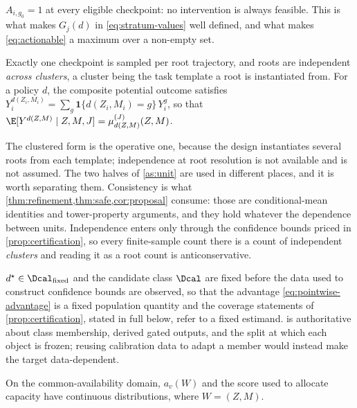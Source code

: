\begin{assumption}
\label{as:baseline}
$A_{i,g_0}=1$ at every eligible checkpoint: no intervention is always feasible.
This is what makes $G_j(d)$ in \eqref{eq:stratum-values} well defined, and what
makes \eqref{eq:actionable} a maximum over a non-empty set.
\end{assumption}

\begin{assumption}
\label{as:unit}
Exactly one checkpoint is sampled per root trajectory, and roots are independent
\emph{across clusters}, a cluster being the task template a root is instantiated
from.  For a policy $d$, the composite potential outcome satisfies
$Y^{d(Z_i,M_i)}_i=\sum_{g}\mathbf 1\{d(Z_i,M_i)=g\}\,Y^g_i$, so that
$\E[Y^{d(Z,M)}\mid Z,M,J]=\mu^{(J)}_{d(Z,M)}(Z,M)$.
\end{assumption}

The clustered form is the operative one, because the design instantiates several
roots from each template; independence at root resolution is not available and is
not assumed.  The two halves of \cref{as:unit} are used in different places, and
it is worth separating them.  Consistency is what
\cref{thm:refinement,thm:safe,cor:proposal} consume: those are conditional-mean
identities and tower-property arguments, and they hold whatever the dependence
between units.  Independence enters only through the confidence bounds priced in
\cref{prop:certification}, so every finite-sample count there is a count of
independent \emph{clusters} and reading it as a root count is anticonservative.

\begin{assumption}
\label{as:frozen}
$d^\star\in\Dcal_{\mathrm{fixed}}$ and the candidate class $\Dcal$ are fixed
before the data used to construct confidence bounds are observed, so that the
advantage \eqref{eq:pointwise-advantage} is a fixed population quantity and the
coverage statements of \cref{prop:certification}, stated in full below, refer
to a fixed estimand.   is authoritative about class membership,
derived gated outputs, and the split at which each object is frozen; reusing
calibration data to adapt a member would instead make the target data-dependent.
\end{assumption}

\begin{assumption}
\label{as:continuity}
On the common-availability domain, $a_v(W)$ and the score used to allocate
capacity have continuous distributions, where $W=(Z,M)$.
\end{assumption}


